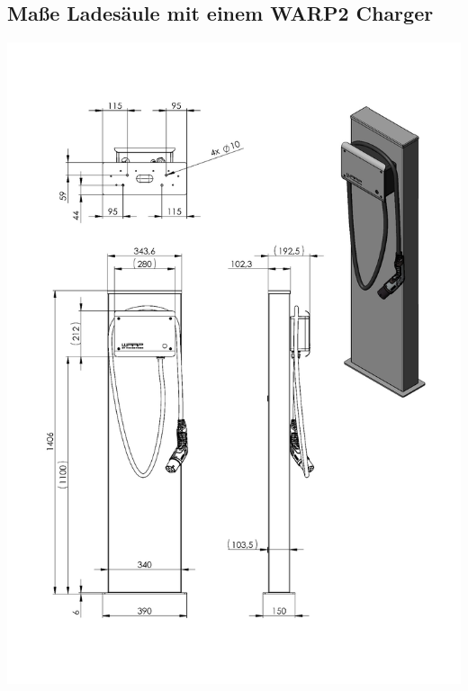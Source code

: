 \documentclass[a4paper,10pt]{article}
\begin{document}
	\subsection{Maße Ladesäule mit einem WARP2 Charger}
	\label{appendix_stand1}
	\begin{center}
		\includegraphics[width=0.9\linewidth]{./img/stand_1}
	\end{center}
\end{document}
